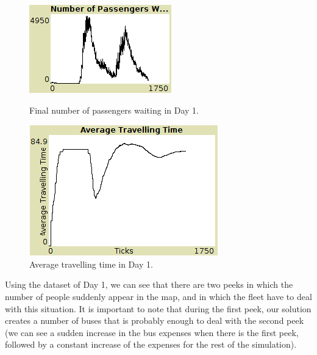 \begin{figure}[htbp]
\centering
\begin{minipage}{.48\textwidth}
  \includegraphics[width=\linewidth]{src/nr_pass_waiting.png}
  \caption{\label{fig:pass_waiting}Final number of passengers waiting in Day 1.}
\end{minipage}%
\begin{minipage}{.48\textwidth}
  \includegraphics[width=\linewidth]{src/avg_tt.png}
  \caption{\label{fig:avg_tt}Average travelling time in Day 1.}
\end{minipage}
\end{figure}

Using the dataset of Day 1, we can see that there are two peeks in which the number of people suddenly appear in the map, and in which the fleet have to deal with this situation. It is important to note that during the first peek, our solution creates a number of buses that is probably enough to deal with the second peek (we can see a sudden increase in the bus expenses when there is the first peek, followed by a constant increase of the expenses for the rest of the simulation).

